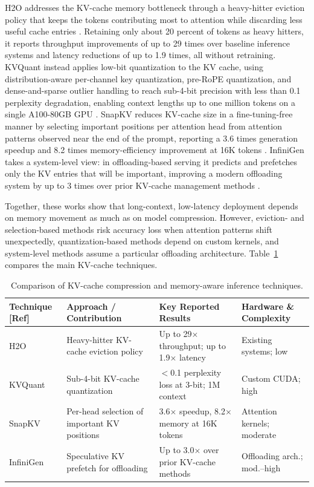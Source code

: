 \documentclass[
11pt, %
english, %
singlespacing, %
headsepline, %
]{MastersDoctoralThesis} %
\begin{document}
H2O addresses the KV-cache memory bottleneck through a heavy-hitter eviction policy that keeps the tokens contributing most to attention while discarding less useful cache entries \cite{zhang2023h2o}. Retaining only about 20 percent of tokens as heavy hitters, it reports throughput improvements of up to 29 times over baseline inference systems and latency reductions of up to 1.9 times, all without retraining. KVQuant instead applies low-bit quantization to the KV cache, using distribution-aware per-channel key quantization, pre-RoPE quantization, and dense-and-sparse outlier handling to reach sub-4-bit precision with less than 0.1 perplexity degradation, enabling context lengths up to one million tokens on a single A100-80GB GPU \cite{hooper2024kvquant}. SnapKV reduces KV-cache size in a fine-tuning-free manner by selecting important positions per attention head from attention patterns observed near the end of the prompt, reporting a 3.6 times generation speedup and 8.2 times memory-efficiency improvement at 16K tokens \cite{li2024snapkv}. InfiniGen takes a system-level view: in offloading-based serving it predicts and prefetches only the KV entries that will be important, improving a modern offloading system by up to 3 times over prior KV-cache management methods \cite{lee2024infinigen}.

Together, these works show that long-context, low-latency deployment depends on memory movement as much as on model compression. However, eviction- and selection-based methods risk accuracy loss when attention patterns shift unexpectedly, quantization-based methods depend on custom kernels, and system-level methods assume a particular offloading architecture. Table~\ref{tab:lr-kv} compares the main KV-cache techniques.

\begin{table}[htbp]
\centering
\scriptsize
\caption{Comparison of KV-cache compression and memory-aware inference techniques.}
\label{tab:lr-kv}
\renewcommand{\arraystretch}{1.2}
\begin{tabular}{p{}p{}p{}p{}}
\hline
\textbf{Technique [Ref]} & \textbf{Approach / Contribution} & \textbf{Key Reported Results} & \textbf{Hardware \& Complexity} \\
\hline
H2O \cite{zhang2023h2o} & Heavy-hitter KV-cache eviction policy & Up to 29$\times$ throughput; up to 1.9$\times$ latency & Existing systems; low \\
KVQuant \cite{hooper2024kvquant} & Sub-4-bit KV-cache quantization & $<$0.1 perplexity loss at 3-bit; 1M context & Custom CUDA; high \\
SnapKV \cite{li2024snapkv} & Per-head selection of important KV positions & 3.6$\times$ speedup, 8.2$\times$ memory at 16K tokens & Attention kernels; moderate \\
InfiniGen \cite{lee2024infinigen} & Speculative KV prefetch for offloading & Up to 3.0$\times$ over prior KV-cache methods & Offloading arch.; mod.--high \\
\hline
\end{tabular}
\end{table}
\end{document}
